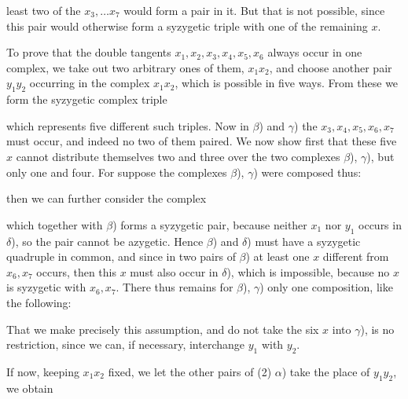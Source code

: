least two of the $x_3, \dots x_7$ would form a pair in it. But that is not possible, since this pair would otherwise form a syzygetic triple with one of the remaining $x$.

To prove that the double tangents $x_1, x_2, x_3, x_4, x_5, x_6$ always occur in one complex, we take out two arbitrary ones of them, $x_1 x_2$, and choose another pair $y_1 y_2$ occurring in the complex $x_1 x_2$, which is possible in five ways. From these we form the syzygetic complex triple


which represents five different such triples. Now in $\beta$) and $\gamma$) the $x_3, x_4, x_5, x_6, x_7$ must occur, and indeed no two of them paired. We now show first that these five $x$ cannot distribute themselves two and three over the two complexes $\beta$), $\gamma$), but only one and four. For suppose the complexes $\beta$), $\gamma$) were composed thus:


then we can further consider the complex


which together with $\beta$) forms a syzygetic pair, because neither $x_1$ nor $y_1$ occurs in $\delta$), so the pair cannot be azygetic. Hence $\beta$) and $\delta$) must have a syzygetic quadruple in common, and since in two pairs of $\beta$) at least one $x$ different from $x_6, x_7$ occurs, then this $x$ must also occur in $\delta$), which is impossible, because no $x$ is syzygetic with $x_6, x_7$. There thus remains for $\beta$), $\gamma$) only one composition, like the following:


That we make precisely this assumption, and do not take the six $x$ into $\gamma$), is no restriction, since we can, if necessary, interchange $y_1$ with $y_2$.

If now, keeping $x_1 x_2$ fixed, we let the other pairs of (2) $\alpha$) take the place of $y_1 y_2$, we obtain
